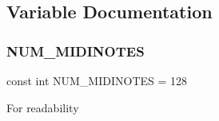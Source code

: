 \subsection{Variable Documentation}
\mbox{\label{fofi~_8h_ae3ab4a4583b2509064f2fbafe7a1f8b0}} 
\subsubsection{\texorpdfstring{NUM\_MIDINOTES}{NUM\_MIDINOTES}}
{\footnotesize\ttfamily const int N\+U\+M\+\_\+\+M\+I\+D\+I\+N\+O\+T\+ES = 128}

For readability 